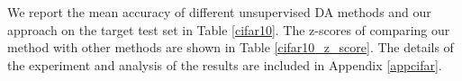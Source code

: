 \documentclass{article}
\newcommand{\markw}[1]{\textbf{\color{green}Mark: #1}}
\begin{document}









 We report the mean accuracy of different unsupervised DA methods and our approach on the target test set in Table \ref{cifar10}. The z-scores of comparing our method with other methods are shown in Table \ref{cifar10_z_score}. The details of the experiment and analysis of the results are included in Appendix \ref{appcifar}.
\end{document}
